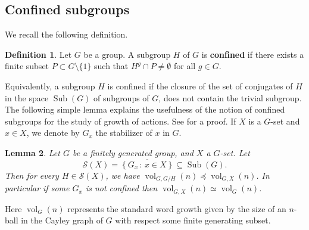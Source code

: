 \documentclass[11pt]{amsart}
\newcommand{\vol}{\ensuremath{\operatorname{vol}}}%
\newcommand{\sub}{\ensuremath{\operatorname{Sub}}}%
\theoremstyle{definition}
\newtheorem{defin}{Definition}[section]
\theoremstyle{plain}
\newtheorem{lem}[defin]{Lemma}
\theoremstyle{remark}
\begin{document}
\subsection{Confined subgroups} 


We recall the following definition.

\begin{defin}
Let $G$ be a group. A subgroup $H$ of $G$ is \textbf{confined} if there exists a finite subset $P \subset G \setminus \{1\}$ such that $H^g \cap P \neq \emptyset$ for all $g \in G$.
\end{defin}

Equivalently, a subgroup $H$ is confined if the closure of the set of conjugates of $H$  in the space $\sub(G)$ of subgroups of $G$, does not contain the trivial subgroup. The following simple lemma explains the usefulness of the notion of confined subgroups for the study of growth of actions. See \cite[Lemma 1.8]{LB-MB-solv} for a proof. If $X$ is a $G$-set and $x \in X$, we denote by $G_x$ the stabilizer of $x$ in $G$.



\begin{lem}\label{lem:SmallGrowthConfined}
Let $G$ be a finitely generated group, and $X$ a $G$-set. Let \[ \mathcal{S}(X) = \overline{ \left\lbrace G_x  \, : \, x \in X \right\rbrace } \subseteq \sub(G). \] Then for every $H \in \mathcal{S}(X)$, we have $\vol_{G, G/H}(n) \preccurlyeq \vol_{G, X}(n)$. In particular if some $G_x$ is not confined then $\vol_{G,X}(n) \simeq \vol_G(n)$. 
\end{lem}

Here $ \vol_G(n)$ represents the standard word growth given by the size of an $n$-ball in the Cayley graph of $G$ with respect some finite generating subset.



\end{document}
